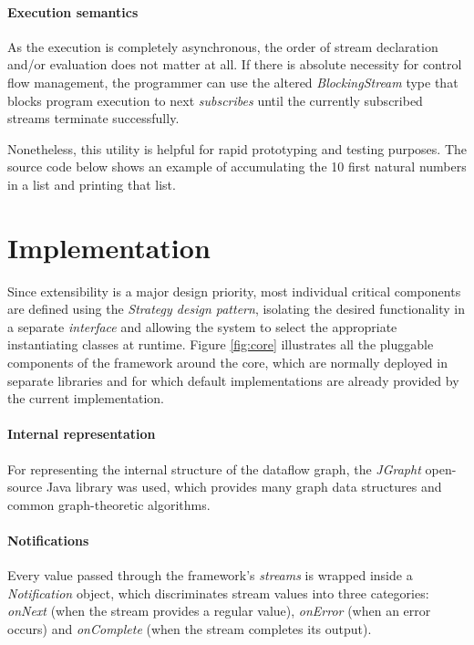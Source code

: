 \documentclass[sigplan,review,anonymous]{acmart}
\begin{document}

\paragraph{Execution semantics}
As the execution is completely asynchronous, the order of stream declaration
and/or evaluation does not matter at all. If there is absolute necessity for
control flow management, the programmer can use the altered
\textit{BlockingStream} type that blocks program execution to next
\textit{subscribes} until the currently subscribed streams terminate
successfully.

Nonetheless, this utility is helpful for rapid prototyping and testing purposes.
The source code below shows an example of accumulating the 10 first natural
numbers in a list and printing that list.


\section{Implementation} \label{sec:implementation}

Since extensibility is a major design priority, most individual critical
components are defined using the \textit{Strategy design pattern}, isolating the desired
functionality in a separate \textit{interface} and allowing the system to select the
appropriate instantiating classes at runtime. Figure \ref{fig:core} illustrates all the
pluggable components of the framework around the core, which are normally deployed in separate libraries
and for which default implementations are already provided by the current implementation.

\paragraph{Internal representation}
For representing the internal structure of the dataflow graph, the
\textit{JGrapht} open-source Java library was used, which provides many graph
data structures and common graph-theoretic algorithms.

\paragraph{Notifications}
Every value passed through the framework's
\textit{streams} is wrapped inside a \textit{Notification} object, which
discriminates stream values into three categories: \textit{onNext} (when the
stream provides a regular value), \textit{onError} (when an error occurs) and
\textit{onComplete} (when the stream completes its output).
\end{document}
